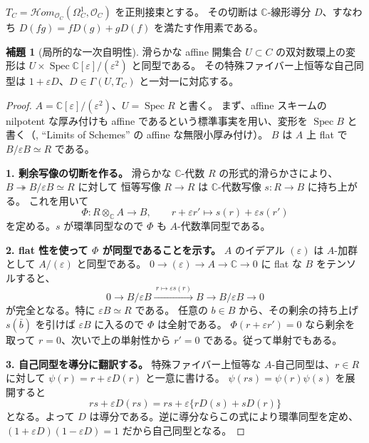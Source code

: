 \documentclass[dvipdfmx,a4paper,11pt]{article}
\theoremstyle{definition}
\newtheorem{lem}[thm]{補題}
\newcommand{\C}{\mathbb C}\newcommand{\R}{\mathbb R}\newcommand{\Z}{\mathbb Z}\newcommand{\Q}{\mathbb Q}
\newcommand{\OO}{\mathcal O}\newcommand{\MM}{\mathcal M}\newcommand{\TT}{\mathcal T}
\DeclareMathOperator{\Spec}{Spec}\DeclareMathOperator{\Proj}{Proj}\DeclareMathOperator{\GL}{GL}
\newcommand{\eps}{\varepsilon}
\begin{document}
$T_C=\mathcal Hom_{\OO_C}(\Omega_C^1,\OO_C)$ を正則接束とする。
その切断は $\C$-線形導分 $D$、すなわち $D(fg)=fD(g)+gD(f)$ を満たす作用素である。

\begin{lem}[局所的な一次自明性]\label{lem:localdef}
滑らかな affine 開集合 $U\subset C$ の双対数環上の変形は $U\times\Spec\C[\eps]/(\eps^2)$ と同型である。
その特殊ファイバー上恒等な自己同型は $1+\eps D$、$D\in\Gamma(U,T_C)$ と一対一に対応する。
\end{lem}
\begin{proof}
$A=\C[\eps]/(\eps^2)$、$U=\Spec R$ と書く。
まず、affine スキームの nilpotent な厚み付けも affine であるという標準事実を用い、変形を $\Spec B$ と書く（\cite{Stacks}, ``Limits of Schemes'' の affine な無限小厚み付け）。
$B$ は $A$ 上 flat で $B/\eps B\simeq R$ である。

\textbf{1. 剰余写像の切断を作る。}
滑らかな $\C$-代数 $R$ の形式的滑らかさにより、$B\twoheadrightarrow B/\eps B\simeq R$ に対して
恒等写像 $R\to R$ は $\C$-代数写像 $s:R\to B$ に持ち上がる。
これを用いて
\[
\Phi:R\otimes_\C A\longrightarrow B,\qquad
r+\eps r'\longmapsto s(r)+\eps s(r')
\]
を定める。$s$ が環準同型なので $\Phi$ も $A$-代数準同型である。

\textbf{2. flat 性を使って $\Phi$ が同型であることを示す。}
$A$ のイデアル $(\eps)$ は $A$-加群として $A/(\eps)$ と同型である。
$0\to(\eps)\to A\to\C\to0$ に flat な $B$ をテンソルすると、
\[
0\longrightarrow B/\eps B\xrightarrow{\ r\mapsto\eps s(r)\ }B
\longrightarrow B/\eps B\longrightarrow0
\]
が完全となる。特に $\eps B\simeq R$ である。
任意の $b\in B$ から、その剰余の持ち上げ $s(\bar b)$ を引けば $\eps B$ に入るので $\Phi$ は全射である。
$\Phi(r+\eps r')=0$ なら剰余を取って $r=0$、次いで上の単射性から $r'=0$ である。従って単射でもある。

\textbf{3. 自己同型を導分に翻訳する。}
特殊ファイバー上恒等な $A$-自己同型は、$r\in R$ に対して
$\psi(r)=r+\eps D(r)$ と一意に書ける。
$\psi(rs)=\psi(r)\psi(s)$ を展開すると
\[
rs+\eps D(rs)=rs+\eps\{rD(s)+sD(r)\}
\]
となる。よって $D$ は導分である。逆に導分ならこの式により環準同型を定め、
$(1+\eps D)(1-\eps D)=1$ だから自己同型となる。
\end{proof}
\end{document}

